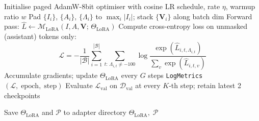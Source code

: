 \documentclass[12pt]{article}
\begin{document}
\begin{algorithm}[H]
\begin{algorithmic}[1]
\State Initialise paged AdamW-8bit optimiser with cosine LR schedule, rate $\eta$, warmup ratio $w$
        \State Pad $\{I_i\}$, $\{A_i\}$, $\{\Lambda_i\}$ to $\max_i|I_i|$; stack $\{\mathbf{V}_i\}$ along batch dim
        \State Forward pass: $\hat{L} \gets \mathcal{M}_{\text{LoRA}}(I, A, \mathbf{V};\,\Theta_{\text{LoRA}})$
        \State Compute cross-entropy loss on unmasked (assistant) tokens only:
        \[
            \mathcal{L} = -\frac{1}{|\mathcal{B}|}
            \sum_{i=1}^{|\mathcal{B}|}
            \sum_{t:\,\Lambda_{i,t} \neq -100}
            \log \frac{\exp\!\left(\hat{L}_{i,t,\Lambda_{i,t}}\right)}
                      {\sum_{v} \exp\!\left(\hat{L}_{i,t,v}\right)}
        \]
        \State Accumulate gradients; update $\Theta_{\text{LoRA}}$ every $G$ steps
        \State \texttt{LogMetrics}$(\mathcal{L},\;\text{epoch},\;\text{step})$
    \EndFor
    \State Evaluate $\mathcal{L}_{\text{val}}$ on $\mathcal{D}_{\text{val}}$ at every $K$-th step; retain latest 2 checkpoints
\EndFor

\State Save $\Theta_{\text{LoRA}}$ and $\mathcal{P}$ to adapter directory 
\State \Return $\Theta_{\text{LoRA}},\;\mathcal{P}$

\end{algorithmic}
\end{algorithm}
\end{document}
